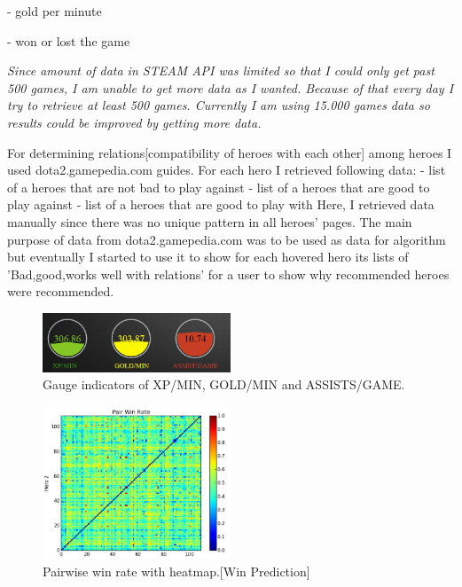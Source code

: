 \documentclass[twocolumn]{autart}    %
\begin{document}
	-   gold per minute

	-   won or lost the game

\emph{Since amount of data in STEAM API was limited so that I could only get past 500 games, I am unable to get more data as I wanted. Because of that every day I try to retrieve at least 500 games. Currently I am using 15.000 games data so results could be improved by getting more data.}

For determining relations[compatibility of heroes with each other] among heroes I used dota2.gamepedia.com guides. For each hero I retrieved following data:
	- list of a heroes that are not bad to play against
	- list of a heroes that are  good to play against
	- list of a heroes that are good to play with
Here, I retrieved data manually since there was no unique pattern in all heroes' pages. The main purpose of data from dota2.gamepedia.com was to be used as data for algorithm but eventually I started to use it to show for each hovered hero its lists of 'Bad,good,works well with relations' for a user to show why recommended heroes were recommended.   


\begin{figure}
  \centering
  
    \includegraphics[width=0.5\textwidth]{indicators.png}
\caption{Gauge indicators of XP/MIN, GOLD/MIN and ASSISTS/GAME.}
 \label{Gauge}
 
\end{figure}


\begin{figure}
  \centering
  
    \includegraphics[width=0.5\textwidth]{stat.png}
\caption{Pairwise win rate with heatmap.[Win Prediction]}
 \label{heatmap}
 
\end{figure}
\end{document}
